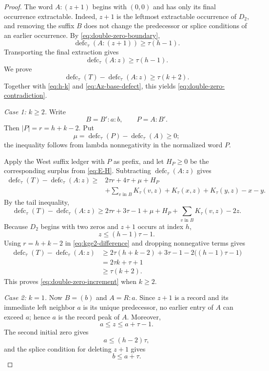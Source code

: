 \documentclass[11pt]{article}
\theoremstyle{definition}
\theoremstyle{remark}
\newcommand{\defc}{\operatorname{defc}}
\begin{document}
\begin{proof}
The word $A:(z+1)$ begins with $(0,0)$ and has only its final occurrence
extractable.  Indeed, $z+1$ is the leftmost extractable occurrence of
$D_2$, and removing the suffix $B$ does not change the predecessor or
splice conditions of an earlier occurrence.  By
\eqref{eq:double-zero-boundary},
\[
 \defc_\tau(A:(z+1))\ge\tau(h-1).
\]
Transporting the final extraction gives
\begin{equation}
 \defc_\tau(A:z)\ge\tau(h-1).
 \label{eq:Az-base-defect}
\end{equation}
We prove
\begin{equation}
 \defc_\tau(T)-\defc_\tau(A:z)\ge\tau(k+2).
 \label{eq:double-zero-increment}
\end{equation}
Together with \eqref{eq:h-k} and \eqref{eq:Az-base-defect}, this yields
\eqref{eq:double-zero-contradiction}.

\medskip
\noindent\emph{Case 1: $k\ge2$.}
Write
\[
 B=B':a:b,
 \qquad
 P=A:B'.
\]
Then $|P|=r=h+k-2$.  Put
\[
 \mu=\defc_\tau(P)-\defc_\tau(A)\ge0;
\]
the inequality follows from lambda nonnegativity in the normalized word
$P$.

Apply the West suffix ledger with $P$ as prefix, and let $H_P\ge0$ be
the corresponding surplus from \eqref{eq:E-H}.  Subtracting
$\defc_\tau(A:z)$ gives
\[
\begin{aligned}
 \defc_\tau(T)-\defc_\tau(A:z)
 \ge{}&2\tau r+4\tau+\mu+H_P\\
 &+\sum_{v\text{ in }B}K_\tau(v,z)
 +K_\tau(x,z)+K_\tau(y,z)-x-y.
\end{aligned}
\]
By the tail inequality,
\begin{equation}
 \defc_\tau(T)-\defc_\tau(A:z)
 \ge2\tau r+3\tau-1+\mu+H_P
 +\sum_{v\text{ in }B}K_\tau(v,z)-2z.
 \label{eq:kge2-difference}
\end{equation}
Because $D_2$ begins with two zeros and $z+1$ occurs at index $h$,
\[
 z\le(h-1)\tau-1.
\]
Using $r=h+k-2$ in \eqref{eq:kge2-difference} and dropping nonnegative
terms gives
\[
\begin{aligned}
 \defc_\tau(T)-\defc_\tau(A:z)
 &\ge2\tau(h+k-2)+3\tau-1
   -2\bigl((h-1)\tau-1\bigr)\\
 &=2\tau k+\tau+1\\
 &\ge\tau(k+2).
\end{aligned}
\]
This proves \eqref{eq:double-zero-increment} when $k\ge2$.

\medskip
\noindent\emph{Case 2: $k=1$.}
Now $B=(b)$ and $A=R:a$.  Since $z+1$ is a record and its immediate
left neighbor $a$ is its unique predecessor, no earlier entry of $A$
can exceed $a$; hence $a$ is the record peak of $A$.  Moreover,
\begin{equation}
 a\le z\le a+\tau-1.
 \label{eq:a-z}
\end{equation}
The second initial zero gives
\begin{equation}
 a\le(h-2)\tau,
 \label{eq:a-height}
\end{equation}
and the splice condition for deleting $z+1$ gives
\begin{equation}
 b\le a+\tau.
 \label{eq:b-splice}
\end{equation}


\end{proof}
\end{document}
